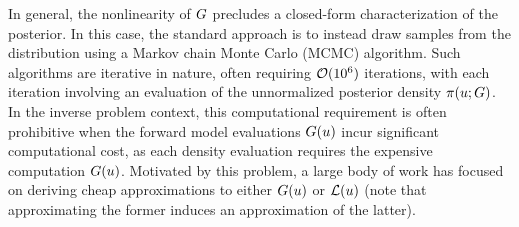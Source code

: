 \documentclass[12pt]{article}
\begin{document}
In general, the nonlinearity of $G$ precludes a closed-form characterization of the posterior. In this case, the 
standard approach is to instead draw samples from the distribution using a Markov chain Monte Carlo (MCMC) 
algorithm. Such algorithms are iterative in nature, often requiring $\mathcal{O}(10^6)$ iterations, with each 
iteration involving an evaluation of the unnormalized posterior density $\pi(u; G)$. 
In the inverse problem context, this computational requirement is often prohibitive when the forward model 
evaluations $G(u)$ incur significant computational cost, as each density evaluation requires the 
expensive computation $G(u)$. Motivated by this problem, a large body of work has focused on deriving 
cheap approximations to either $G(u)$ or $\mathcal{L}(u)$ (note that approximating the former induces 
an approximation of the latter). 
 
\end{document}
